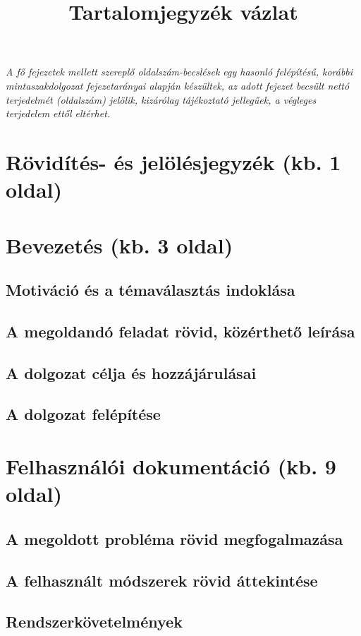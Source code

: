 \documentclass[12pt,a4paper]{article}
\title{Tartalomjegyzék vázlat}
\author{}
\date{}
\begin{document}
\maketitle
\tableofcontents
\newpage

\noindent\textit{A fő fejezetek mellett szereplő oldalszám-becslések egy hasonló felépítésű, korábbi
mintaszakdolgozat fejezetarányai alapján készültek, az adott fejezet becsült nettó terjedelmét (oldalszám)
jelölik, kizárólag tájékoztató jellegűek, a végleges terjedelem ettől eltérhet.}

\bigskip

\section{Rövidítés- és jelölésjegyzék (kb. 1 oldal)}

\section{Bevezetés (kb. 3 oldal)}
\subsection{Motiváció és a témaválasztás indoklása}
\subsection{A megoldandó feladat rövid, közérthető leírása}
\subsection{A dolgozat célja és hozzájárulásai}
\subsection{A dolgozat felépítése}

\section{Felhasználói dokumentáció (kb. 9 oldal)}
\subsection{A megoldott probléma rövid megfogalmazása}
\subsection{A felhasznált módszerek rövid áttekintése}
\subsection{Rendszerkövetelmények}
\end{document}
